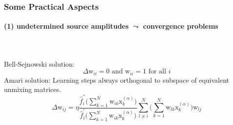 \subsubsection{Some Practical Aspects}
\paragraph{(1) undetermined source amplitudes $\leadsto$ convergence problems}
\mbox{}\\\\
Bell-Sejnowski solution:
\begin{equation}
	\Delta \mathrm{w}_{ii} = 0 \text{ and } \mathrm{w}_{ii} = 1 
	\text{ for all } i
\end{equation}
Amari solution: Learning steps always orthogonal to subspace of
equivalent unmixing matrices.
\begin{equation}
	\Delta \mathrm{w}_{ij} = \eta \frac{ \widehat{f}_i^{''} \bigg( 
		\sum\limits_{k = 1}^N 
		\mathrm{w}_{ik} \mathrm{x}_k^{(\alpha)} \bigg)
		}{\widehat{f}_i^{'} \bigg( \sum\limits_{k = 1}^N 
		\mathrm{w}_{ik} \mathrm{x}_k^{(\alpha)} \bigg)}
		\sum\limits_{l \neq i}^N \Bigg( \sum\limits_{k = 1}^N
		\mathrm{w}_{lk} \mathrm{x}_k^{(\alpha)} \Bigg)
		\mathrm{w}_{lj}
\end{equation}

